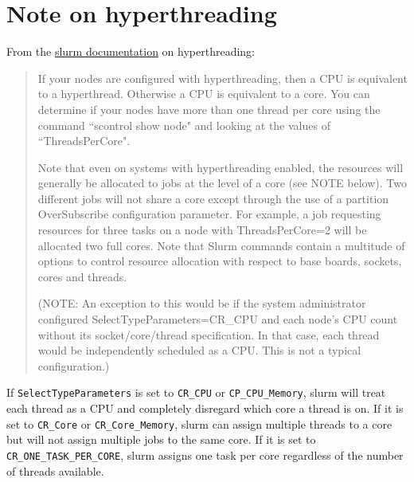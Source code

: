 \section{Note on hyperthreading} \label{sec:slurmHT}


From the \href{https://slurm.schedmd.com/faq.html}{slurm documentation} on hyperthreading:
	\begin{quotation}
	If your nodes are configured with hyperthreading, then a CPU is equivalent to a hyperthread. Otherwise a CPU is equivalent to a core. You can determine if your nodes have more than one thread per core using the command ``scontrol show node" and looking at the values of ``ThreadsPerCore".

	Note that even on systems with hyperthreading enabled, the resources will generally be allocated to jobs at the level of a core (see NOTE below). Two different jobs will not share a core except through the use of a partition OverSubscribe configuration parameter. For example, a job requesting resources for three tasks on a node with ThreadsPerCore=2 will be allocated two full cores. Note that Slurm commands contain a multitude of options to control resource allocation with respect to base boards, sockets, cores and threads.

	(NOTE: An exception to this would be if the system administrator configured SelectTypeParameters=CR\_CPU and each node's CPU count without its socket/core/thread specification. In that case, each thread would be independently scheduled as a CPU. This is not a typical configuration.)
	\end{quotation}

If \texttt{SelectTypeParameters} is set to \texttt{CR\_CPU} or \texttt{CP\_CPU\_Memory}, slurm will treat each thread as a CPU and completely disregard which core a thread is on. If it is set to \texttt{CR\_Core} or \texttt{CR\_Core\_Memory}, slurm can assign multiple threads to a core but will not assign multiple jobs to the same core. If it is set to \texttt{CR\_ONE\_TASK\_PER\_CORE}, slurm assigns one task per core regardless of the number of threads available. 

%
%
%
%
%

